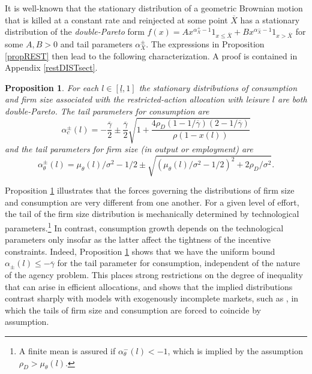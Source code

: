\documentclass[11pt]{article}
\theoremstyle{plain}
\newtheorem{prop}[thm]{Proposition}
\begin{document}
It is well-known that the stationary distribution of a geometric Brownian motion that is killed at a constant rate and reinjected at some point $\overline{X}$ has a stationary distribution of the \textit{double-Pareto} form $f(x) = A x^{\alpha^+_X-1}1_{x \leq \overline{X}} + B x^{\alpha^-_X-1}1_{x > \overline{X}}$ for some $A,B > 0$ and tail parameters $\alpha^{\pm}_X$. The expressions in Proposition \ref{propREST} then lead to the following characterization. A proof is contained in Appendix \ref{restDISTsect}.

\begin{prop}\label{RESTdist}
For each $l \in [\underline{l},1]$ the stationary distributions of consumption and firm size associated with the restricted-action allocation with leisure $l$ are both double-Pareto. The tail parameters for consumption are 
$$
\alpha^{\pm}_c (l) = -\frac{\overline{\gamma}}{2}  \pm  \frac{\overline{\gamma}}{2}\sqrt{1 + \frac{4\rho_D(1 - 1/\overline{\gamma}) (2-1/\overline{\gamma})}{\rho(1-x(l))}} 
$$ 
and the tail parameters for firm size (in output or employment) are 
$$
\alpha^{\pm}_\theta (l) = \mu_{\theta}(l)/\sigma^2 - 1/2 \pm \sqrt{(\mu_{\theta}(l)/\sigma^2 - 1/2)^2 + 2\rho_D/\sigma^2}.
$$
\end{prop}  %
Proposition \ref{RESTdist} illustrates that the forces governing the distributions of firm size and consumption are very different from one another. For a given level of effort, the tail of the firm size distribution is mechanically determined by technological parameters.\footnote{A finite mean is assured if $\alpha_{\theta}^-(l) < -1$, which is implied by the assumption $\rho_D > \mu_{\theta}(l)$.} In contrast, consumption growth depends on the technological parameters only insofar as the latter affect the tightness of the incentive constraints. Indeed, Proposition \ref{RESTdist} shows that we have the uniform bound $\alpha_\pm (l) \leq -\overline{\gamma}$ for the tail parameter for consumption, independent of the nature of the agency problem. This places strong restrictions on the degree of inequality that can arise in efficient allocations, and shows that the implied distributions contrast sharply with models with exogenously incomplete markets, such as \cite{jones_schumpeterian_2018}, in which the tails of firm size and consumption are forced to coincide by assumption. 
\end{document}
